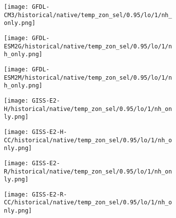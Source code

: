 \documentclass[preview]{standalone}
\begin{document}
\begin{figure}
  \begin{subfigure}[t]{\textwidth}
    \texttt{[image: GFDL-CM3/historical/native/temp\_zon\_sel/0.95/lo/1/nh\_only.png]}
  \end{subfigure}
\end{figure}

\begin{figure}
  \begin{subfigure}[t]{\textwidth}
    \texttt{[image: GFDL-ESM2G/historical/native/temp\_zon\_sel/0.95/lo/1/nh\_only.png]}
  \end{subfigure}
\end{figure}

\begin{figure}
  \begin{subfigure}[t]{\textwidth}
    \texttt{[image: GFDL-ESM2M/historical/native/temp\_zon\_sel/0.95/lo/1/nh\_only.png]}
  \end{subfigure}
\end{figure}

\begin{figure}
  \begin{subfigure}[t]{\textwidth}
    \texttt{[image: GISS-E2-H/historical/native/temp\_zon\_sel/0.95/lo/1/nh\_only.png]}
  \end{subfigure}
\end{figure}

\begin{figure}
  \begin{subfigure}[t]{\textwidth}
    \texttt{[image: GISS-E2-H-CC/historical/native/temp\_zon\_sel/0.95/lo/1/nh\_only.png]}
  \end{subfigure}
\end{figure}

\begin{figure}
  \begin{subfigure}[t]{\textwidth}
    \texttt{[image: GISS-E2-R/historical/native/temp\_zon\_sel/0.95/lo/1/nh\_only.png]}
  \end{subfigure}
\end{figure}

\begin{figure}
  \begin{subfigure}[t]{\textwidth}
    \texttt{[image: GISS-E2-R-CC/historical/native/temp\_zon\_sel/0.95/lo/1/nh\_only.png]}
  \end{subfigure}
\end{figure}
\end{document}
